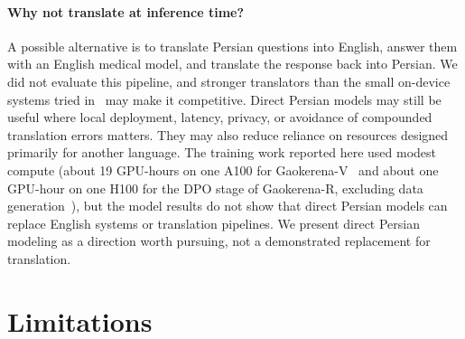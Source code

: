 \documentclass[manuscript,screen,review]{acmart}
\begin{document}
\paragraph{Why not translate at inference time?} A possible alternative is to translate Persian questions into English, answer them with an English medical model, and translate the response back into Persian. We did not evaluate this pipeline, and stronger translators than the small on-device systems tried in~\cite{b1} may make it competitive. Direct Persian models may still be useful where local deployment, latency, privacy, or avoidance of compounded translation errors matters. They may also reduce reliance on resources designed primarily for another language. The training work reported here used modest compute (about 19 GPU-hours on one A100 for Gaokerena-V~\cite{b1} and about one GPU-hour on one H100 for the DPO stage of Gaokerena-R, excluding data generation~\cite{b2}), but the model results do not show that direct Persian models can replace English systems or translation pipelines. We present direct Persian modeling as a direction worth pursuing, not a demonstrated replacement for translation.

\section{Limitations}\label{sec:limitations}
\end{document}

